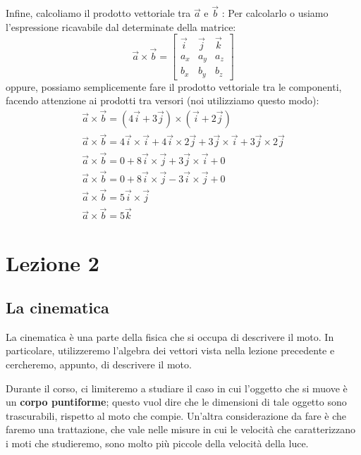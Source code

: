 \documentclass[a4paper]{book}
\begin{document}
Infine, calcoliamo il prodotto vettoriale tra $ \overrightarrow{a} $ e $ \overrightarrow{b} $ :
Per calcolarlo o usiamo l'espressione ricavabile dal determinate della matrice:
$$ \overrightarrow{a} \times \overrightarrow{b} = \begin{bmatrix}
\overrightarrow{i} & \overrightarrow{j} & \overrightarrow{k} \\
a_{x} & a_{y} & a_{z} \\
b_{x} & b_{y} & b_{z}
\end{bmatrix} $$
oppure, possiamo semplicemente fare il prodotto vettoriale tra le componenti, facendo attenzione ai prodotti tra versori (noi utilizziamo questo modo):
\begin{align*}
\overrightarrow{a} \times \overrightarrow{b} = ( 4 \overrightarrow{i} + 3 \overrightarrow{j} ) \times ( \overrightarrow{i} + 2 \overrightarrow{j} ) \\
\overrightarrow{a} \times \overrightarrow{b} = 4 \overrightarrow{i} \times \overrightarrow{i} + 4\overrightarrow{i} \times 2 \overrightarrow{j} + 3 \overrightarrow{j} \times \overrightarrow{i} + 3 \overrightarrow{j} \times 2 \overrightarrow{j} \\
\overrightarrow{a} \times \overrightarrow{b} = 0 + 8 \overrightarrow{i} \times \overrightarrow{j} + 3 \overrightarrow{j} \times \overrightarrow{i} + 0 \\
\overrightarrow{a} \times \overrightarrow{b} = 0 + 8\overrightarrow{i} \times \overrightarrow{j} - 3 \overrightarrow{i} \times \overrightarrow{j} + 0 \\
\overrightarrow{a} \times \overrightarrow{b} = 5 \overrightarrow{i} \times \overrightarrow{j} \\
\overrightarrow{a} \times \overrightarrow{b} = 5 \overrightarrow{k}
\end{align*}

\chapter{Lezione 2}
\section{La cinematica}
La cinematica è una parte della fisica che si occupa di descrivere il moto. In particolare, utilizzeremo l'algebra dei vettori vista nella lezione precedente e cercheremo, appunto, di descrivere il moto.

Durante il corso, ci limiteremo a studiare il caso in cui l'oggetto che si muove è un \textbf{corpo puntiforme}; questo vuol dire che le dimensioni di tale oggetto sono trascurabili, rispetto al moto che compie. Un'altra considerazione da fare è che faremo una trattazione, che vale nelle misure in cui le velocità che caratterizzano i moti che studieremo, sono molto più piccole della velocità della luce.
\end{document}
